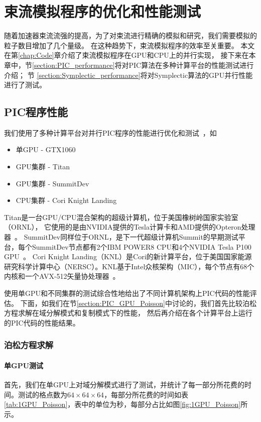 \chapter{束流模拟程序的优化和性能测试} \label{chap:Performance}
随着加速器束流流强的提高，为了对束流进行精确的模拟和研究，我们需要模拟的粒子数目增加了几个量级。
在这种趋势下，束流模拟程序的效率至关重要。
本文在第\eqref{chap:Code}章介绍了束流模拟程序在GPU和CPU上的并行实现，
接下来在本章中，节\eqref{section:PIC_performance}将对PIC算法在多种计算平台的性能测试进行介绍；
节 \eqref{section:Symplectic_performance}将对Symplectic算法的GPU并行性能进行了测试。

\section{PIC程序性能}             \label{section:PIC_performance}
我们使用了多种计算平台对并行PIC程序的性能进行优化和测试~\cite{tiwari2015Titan,wells2016Summit,he2018Cori}，如
\begin{itemize}
  \item 单GPU - GTX1060
  \item GPU集群 - Titan
  \item GPU集群 - SummitDev
  \item CPU集群 - Cori Knight Landing
\end{itemize}

Titan是一台GPU/CPU混合架构的超级计算机，位于美国橡树岭国家实验室（ORNL），
它使用的是由NVIDIA提供的Tesla计算卡和AMD提供的Opteron处理器~\cite{TitanURL}。
SummitDev同样位于ORNL，是下一代超级计算机Summit的早期测试平台，每个SummitDev节点都有2个IBM POWER8 CPU和4个NVIDIA Tesla P100 GPU~\cite{SummitURL}。
Cori Knight Landing（KNL）是Cori的新计算平台，位于美国国家能源研究科学计算中心（NERSC）。KNL基于Intel众核架构（MIC），每个节点有68个内核和一个AVX-512矢量协处理器~\cite{KnlURL}。

使用单GPU和不同集群的测试综合性地给出了不同计算机架构上PIC代码的性能评估。
下面，如我们在节\eqref{section:PIC_GPU_Poisson}中讨论的，我们首先比较泊松方程求解在域分解模式和复制模式下的性能，
然后再介绍在各个计算平台上运行的PIC代码的性能结果。

\subsection{泊松方程求解}
\label{section:PIC_performance_Poisson}

\subsubsection{单GPU测试}
首先，我们在单GPU上对域分解模式进行了测试，并统计了每一部分所花费的时间。测试的格点数为$64 \times 64 \times 64$，每部分所花费的时间如表\eqref{tab:1GPU_Poisson}，表中的单位为秒，每部分占比如图\eqref{fig:1GPU_Poisson}所示。

